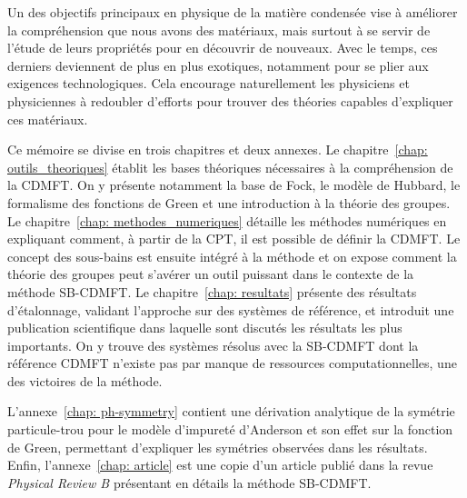 Un des objectifs principaux en physique de la matière condensée vise à améliorer la compréhension que nous avons des matériaux, mais surtout à se servir de l’étude de leurs propriétés pour en découvrir de nouveaux. Avec le temps, ces derniers deviennent de plus en plus exotiques, notamment pour se plier aux exigences technologiques. Cela encourage naturellement les physiciens et physiciennes à redoubler d'efforts pour trouver des théories capables d'expliquer ces matériaux.

Ce mémoire se divise en trois chapitres et deux annexes. Le chapitre~\ref{chap: outils_theoriques} établit les bases théoriques nécessaires à la compréhension de la CDMFT. On y présente notamment la base de Fock, le modèle de Hubbard, le formalisme des fonctions de Green et une introduction à la théorie des groupes. Le chapitre~\ref{chap: methodes_numeriques} détaille les méthodes numériques en expliquant comment, à partir de la CPT, il est possible de définir la CDMFT. Le concept des sous-bains est ensuite intégré à la méthode et on expose comment la théorie des groupes peut s’avérer un outil puissant dans le contexte de la méthode SB-CDMFT. Le chapitre~\ref{chap: resultats} présente des résultats d'étalonnage, validant l'approche sur des systèmes de référence, et introduit une publication scientifique dans laquelle sont discutés les résultats les plus importants. On y trouve des systèmes résolus avec la SB-CDMFT dont la référence CDMFT n'existe pas par manque de ressources computationnelles, une des victoires de la méthode.

L'annexe~\ref{chap: ph-symmetry} contient une dérivation analytique de la symétrie particule-trou pour le modèle d'impureté d'Anderson et son effet sur la fonction de Green, permettant d'expliquer les symétries observées dans les résultats. Enfin, l'annexe~\ref{chap: article} est une copie d'un article publié dans la revue \textit{Physical Review B} présentant en détails la méthode SB-CDMFT.

